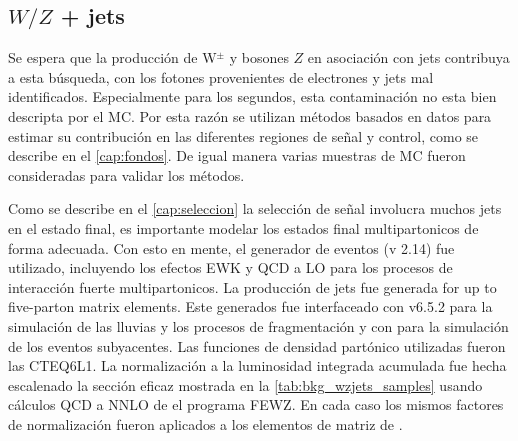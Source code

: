 \begin{table}[ht!]
\begin{tabular}{lccccc}
    \hline
  \end{tabular}
  \label{tab:bkg_wzgamma_samples}
\end{table}

\subsection{$W/Z$ + jets}
\label{mc_wzjets}

Se espera que la producción de W$^{\pm}$ y bosones $Z$ en asociación con jets
contribuya a esta búsqueda, con los fotones provenientes de electrones y jets
mal identificados. Especialmente para los segundos, esta contaminación no esta
bien descripta por el MC. Por esta razón se utilizan métodos basados en datos
para estimar su contribución en las diferentes regiones de señal y control, como
se describe en el \cref{cap:fondos}. De igual manera varias muestras de MC
fueron consideradas para validar los métodos.

Como se describe en el \cref{cap:seleccion} la selección de señal involucra
muchos jets en el estado final, es importante modelar los estados final multipartonicos
de forma adecuada. Con esto en mente, el generador de eventos {\alpgen} (v 2.14)
fue utilizado, incluyendo los efectos EWK y QCD a LO para los procesos de interacción
fuerte multipartonicos. La producción de jets fue generada for up to five-parton
matrix elements. Este generados fue interfaceado con {\herwig} v6.5.2
para la simulación de las lluvias y los procesos de fragmentación y con {\jimmy}
para la simulación de los eventos subyacentes. Las funciones de densidad partónico
utilizadas fueron las CTEQ6L1. La normalización a la luminosidad integrada acumulada
fue hecha escalenado la sección eficaz mostrada en la \cref{tab:bkg_wzjets_samples}
usando cálculos QCD a NNLO de el programa FEWZ\cite{Anastasiou:2003ds}.
En cada caso los mismos factores de normalización fueron aplicados a los elementos
de matriz de {\alpgen}.

